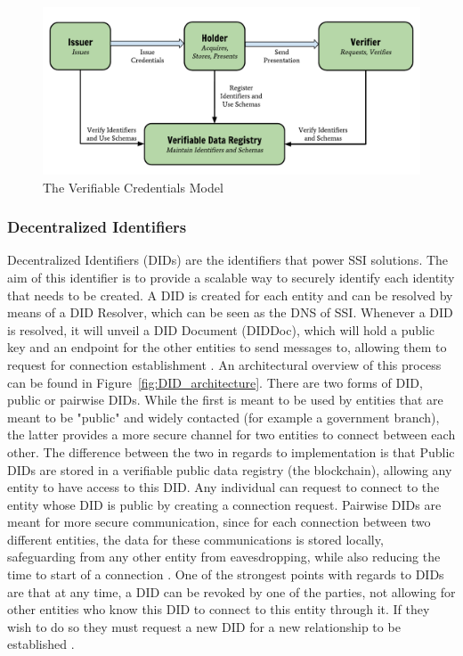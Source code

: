 \begin{figure}[h]
    \centering
    \includegraphics[width=0.7\linewidth]{images/VerifiableCredentialModel.pdf}
    \caption[The Verifiable Credentials Model]{The Verifiable Credentials Model \cite{Zundel:19:VCD}}
    \label{fig:VC_Model}
\end{figure}

\subsubsection{Decentralized Identifiers}
\label{subsubsec:DIDs}

Decentralized Identifiers (DIDs) are the identifiers that power SSI solutions. The aim of this identifier is to provide a scalable way to securely identify each identity that needs to be created. A DID is created for each entity and can be resolved by means of a DID Resolver, which can be seen as the DNS of SSI. Whenever a DID is resolved, it will unveil a DID Document (DIDDoc), which will hold a public key and an endpoint for the other entities to send messages to, allowing them to request for connection establishment  \cite{10.1145/3384943.3409436}. An architectural overview of this process can be found in Figure~\ref{fig:DID_architecture}.
There are two forms of DID, public or pairwise DIDs. While the first is meant to be used by entities that are meant to be "public" and widely contacted (for example a government branch), the latter provides a more secure channel for two entities to connect between each other. The difference between the two in regards to implementation is that Public DIDs are stored in a verifiable public data registry (the blockchain), allowing any entity to have access to this DID. Any individual can request to connect to the entity whose DID is public by creating a connection request. Pairwise DIDs are meant for more secure communication, since for each connection between two different entities, the data for these communications is stored locally, safeguarding from any other entity from eavesdropping, while also reducing the time to start of a connection \cite{terzi2020securing} \cite{theodouli2020towards}.
One of the strongest points with regards to DIDs are that at any time, a DID can be revoked by one of the parties, not allowing for other entities who know this DID to connect to this entity through it. If they wish to do so they must request a new DID for a new relationship to be established \cite{fedrecheski2020self}.

